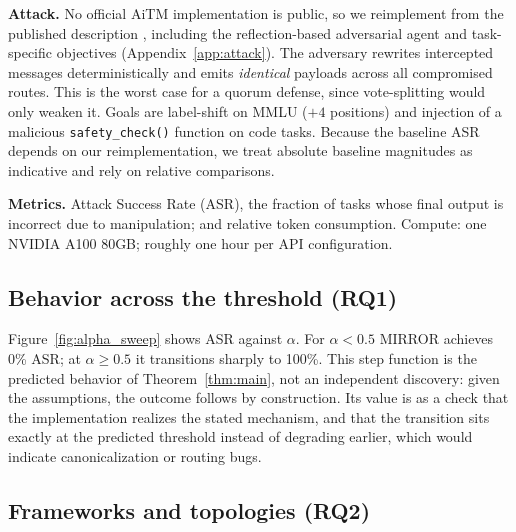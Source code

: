 \documentclass{article}
\begin{document}
\textbf{Attack.} No official AiTM implementation is public, so we reimplement from the published description \citep{he2025redteaming}, including the reflection-based adversarial agent and task-specific objectives (Appendix~\ref{app:attack}). The adversary rewrites intercepted messages deterministically and emits \emph{identical} payloads across all compromised routes. This is the worst case for a quorum defense, since vote-splitting would only weaken it. Goals are label-shift on MMLU ($+4$ positions) and injection of a malicious \texttt{safety\_check()} function on code tasks. Because the baseline ASR depends on our reimplementation, we treat absolute baseline magnitudes as indicative and rely on relative comparisons.

\textbf{Metrics.} Attack Success Rate (ASR), the fraction of tasks whose final output is incorrect due to manipulation; and relative token consumption. Compute: one NVIDIA A100 80GB; roughly one hour per API configuration.

\subsection{Behavior across the threshold (RQ1)}

Figure~\ref{fig:alpha_sweep} shows ASR against $\alpha$. For $\alpha < 0.5$ MIRROR achieves 0\% ASR; at $\alpha \geq 0.5$ it transitions sharply to 100\%. This step function is the predicted behavior of Theorem~\ref{thm:main}, not an independent discovery: given the assumptions, the outcome follows by construction. Its value is as a check that the implementation realizes the stated mechanism, and that the transition sits exactly at the predicted threshold instead of degrading earlier, which would indicate canonicalization or routing bugs.

\subsection{Frameworks and topologies (RQ2)}
\end{document}

